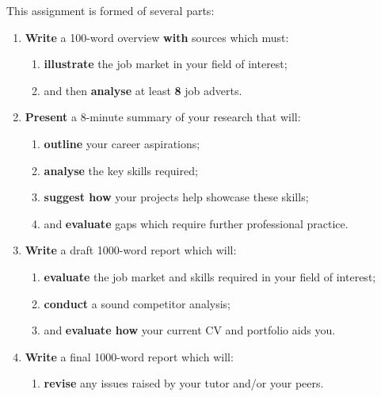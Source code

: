 \documentclass{../../fal_assignment}
\newcommand{\proposalWordCount}{100}
\newcommand{\essayWordCount}{1000}
\newcommand{\presentationMinutes}{8}
\newcommand{\minReferenceCount}{8}
\begin{document}
This assignment is formed of several parts:

\begin{enumerate}[label=(\Alph*)]
    \item \textbf{Write} a \proposalWordCount-word overview \textbf{with} sources which must:
    	\begin{enumerate}[label=\roman*.]
    		\item \textbf{illustrate} the job market in your field of interest;
    		\item and then \textbf{analyse} at least \textbf{\minReferenceCount} job adverts.
	\end{enumerate}
    \item \textbf{Present} a \presentationMinutes-minute summary of your research that will:
    	\begin{enumerate}[label=\roman*.]
    		\item \textbf{outline} your career aspirations;
    		\item \textbf{analyse} the key skills required;
    		\item \textbf{suggest how} your projects help showcase these skills;
    		\item and \textbf{evaluate} gaps which require further professional practice.
	\end{enumerate}
    \item \textbf{Write} a draft \essayWordCount-word report which will:
    	\begin{enumerate}[label=\roman*.]
    		\item  \textbf{evaluate} the job market and skills required in your field of interest;
    		\item  \textbf{conduct} a sound competitor analysis;
    		\item  and \textbf{evaluate how} your current CV and portfolio aids you.
	\end{enumerate}
    \item \textbf{Write} a final \essayWordCount-word report which will:
    	\begin{enumerate}[label=\roman*.]
    		\item \textbf{revise} any issues raised by your tutor and/or your peers.
	\end{enumerate}
\end{enumerate}

\end{document}
